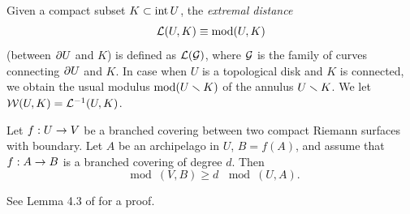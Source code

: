\msk
 Given a compact subset $K\subset \operatorname{int} U$, the {\it extremal distance}
               $${\mathcal L}(U, K)\equiv \operatorname{mod} (U,K)$$
(between $\partial U$ and $K$) is defined as ${\mathcal L}({\mathcal G})$, where ${\mathcal G}$ is the family of curves
connecting $\partial U$ and $K$. In case when $U$ is a topological disk and $K$ is connected,
we obtain the usual modulus $\operatorname{mod}(U\smallsetminus K)$ of the annulus $U\smallsetminus K$.
%
%
 We let ${\mathcal W}(U,K) = {\mathcal L}^{-1}(U,K)$.






\begin{lem}\label{modulus transform-2}
 Let $f: U\rightarrow V$ be a branched covering between two compact Riemann surfaces with boundary.
Let $A$ be an archipelago in $U$,  $B=f(A)$, and
assume that  $f:  A\rightarrow B$ is a branched covering of degree $d$. Then
$$
      \mod(V, B) \geq d\, \mod (U,  A).
$$
\end{lem}

See Lemma 4.3 of \cite{covering lemma} for a proof.



\ssk



